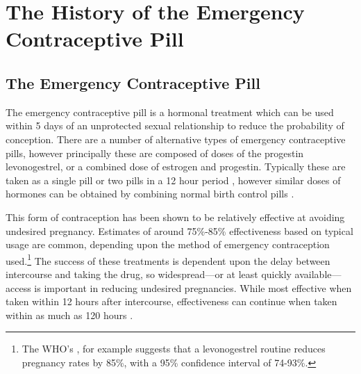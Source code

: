   
\section{The History of the Emergency Contraceptive Pill}
\label{TEENscn:background}
\vspace{-5mm}
\subsection{The Emergency Contraceptive Pill}
The emergency contraceptive pill is a hormonal treatment which can be used 
within 5 days of an unprotected sexual relationship to reduce the probability
of conception.  There are a number of alternative types of emergency 
contraceptive pills, however principally these are composed of doses of the 
progestin levonogestrel, or a combined dose of estrogen and progestin. 
Typically these are taken as a single pill or two pills in a 12 hour period
\citep{vonHertzenetal2002}, however similar doses of hormones can be obtained 
by combining normal birth control pills \citep{Ellersonetal1998}.  

This form of contraception has been shown to be relatively effective at 
avoiding undesired pregnancy.  Estimates of around 75\%-85\% effectiveness 
based on typical usage are common, depending upon the method of emergency 
contraception used.\footnote{The WHO's \citet{WHO1998}, for example suggests 
that a levonogestrel routine reduces pregnancy rates by 85\%, with a 95\% 
confidence interval of 74-93\%.}  The success of these treatments is dependent
upon the delay between intercourse and taking the drug, so widespread---or at 
least quickly available---access is important in reducing undesired pregnancies.
While most effective when taken within 12 hours after intercourse, 
effectiveness can continue when taken within as much as 120 hours
\citep{vonHertzenetal2002}.

